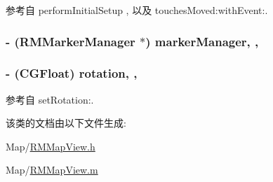参考自 perform\-Initial\-Setup , 以及 touches\-Moved\-:with\-Event\-:.

\hypertarget{interface_r_m_map_view_adb35b8ebc9e8cddb3bfdf560c2d921dd}{
\subsubsection[{marker\-Manager}]{\setlength{\rightskip}{0pt plus 5cm}-\/ ({\bf R\-M\-Marker\-Manager} $\ast$) marker\-Manager\hspace{0.3cm}{\ttfamily [read]}, {\ttfamily [nonatomic]}, {\ttfamily [retain]}}}\label{interface_r_m_map_view_adb35b8ebc9e8cddb3bfdf560c2d921dd}
\hypertarget{interface_r_m_map_view_a5db051adefc02909422ab8452b0db6f2}{
\subsubsection[{rotation}]{\setlength{\rightskip}{0pt plus 5cm}-\/ (C\-G\-Float) rotation\hspace{0.3cm}{\ttfamily [read]}, {\ttfamily [atomic]}, {\ttfamily [assign]}}}\label{interface_r_m_map_view_a5db051adefc02909422ab8452b0db6f2}


参考自 set\-Rotation\-:.



该类的文档由以下文件生成\-:\begin{DoxyCompactItemize}
\item 
Map/\hyperlink{_r_m_map_view_8h}{R\-M\-Map\-View.\-h}\item 
Map/\hyperlink{_r_m_map_view_8m}{R\-M\-Map\-View.\-m}\end{DoxyCompactItemize}
